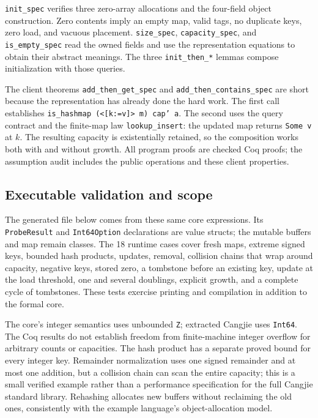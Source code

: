 \documentclass[11pt]{article}
\begin{document}
\texttt{init\_spec} verifies three zero-array allocations and the four-field
object construction. Zero contents imply an empty map, valid tags, no duplicate
keys, zero load, and vacuous placement. \texttt{size\_spec},
\texttt{capacity\_spec}, and \texttt{is\_empty\_spec} read the owned fields and
use the representation equations to obtain their abstract meanings.
The three \texttt{init\_then\_*} lemmas compose initialization with those queries.

The client theorems \texttt{add\_then\_get\_spec} and
\texttt{add\_then\_contains\_spec} are short because the representation has
already done the hard work. The first call establishes
\texttt{is\_hashmap (<[k:=v]> m) cap' a}. The second uses the query contract and
the finite-map law \texttt{lookup\_insert}: the updated map returns
\texttt{Some v} at $k$. The resulting capacity is existentially retained, so
the composition works both with and without growth. All program proofs are
checked Coq proofs; the assumption audit includes the public operations and
these client properties.

\subsection{Executable validation and scope}

The generated file below comes from these same core expressions. Its
\texttt{ProbeResult} and \texttt{Int64Option} declarations are value structs;
the mutable buffers and map remain classes. The 18 runtime cases cover fresh maps, extreme signed keys, bounded hash products,
updates, removal, collision chains that wrap around capacity, negative keys,
stored zero, a tombstone before an existing key, update at the load threshold,
one and several doublings, explicit growth, and a complete cycle of tombstones.
These tests exercise printing and compilation in addition to the formal core.

The core's integer semantics uses unbounded \texttt{Z}; extracted Cangjie uses
\texttt{Int64}. The Coq results do not establish freedom from finite-machine
integer overflow for arbitrary counts or capacities. The hash product has
a separate proved bound for every integer key. Remainder
normalization uses one signed remainder and at most one addition, but a
collision chain can scan the entire capacity; this is a small verified example rather than a
performance specification for the full Cangjie standard library. Rehashing
allocates new buffers without reclaiming the old ones, consistently with the
example language's object-allocation model.
\end{document}
